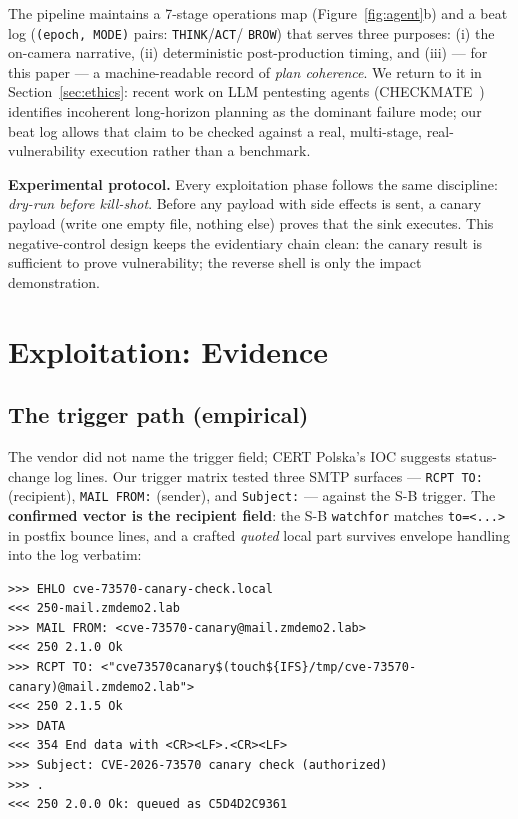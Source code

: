 \documentclass[journal]{IEEEtran}
\begin{document}
The pipeline maintains a 7-stage operations map (Figure~\ref{fig:agent}b) and
a beat log (\texttt{(epoch, MODE)} pairs: \texttt{THINK}/\texttt{ACT}/
\texttt{BROW}) that serves three purposes: (i) the on-camera narrative,
(ii) deterministic post-production timing, and (iii) — for this paper — a
machine-readable record of \emph{plan coherence}. We return to it in
Section~\ref{sec:ethics}: recent work on LLM pentesting agents
(CHECKMATE~\cite{wang2025checkmate}) identifies incoherent long-horizon
planning as the dominant failure mode; our beat log allows that claim to be
checked against a real, multi-stage, real-vulnerability execution rather than
a benchmark.

\textbf{Experimental protocol.} Every exploitation phase follows the same
discipline: \emph{dry-run before kill-shot}. Before any payload with side
effects is sent, a canary payload (write one empty file, nothing else)
proves that the sink executes. This negative-control design keeps the
evidentiary chain clean: the canary result is sufficient to prove
vulnerability; the reverse shell is only the impact demonstration.

\section{Exploitation: Evidence}
\label{sec:exploit}

\subsection{The trigger path (empirical)}

The vendor did not name the trigger field; CERT Polska's IOC suggests
status-change log lines. Our trigger matrix tested three SMTP surfaces —
\texttt{RCPT TO:} (recipient), \texttt{MAIL FROM:} (sender), and
\texttt{Subject:} — against the S-B trigger. The \textbf{confirmed vector is
the recipient field}: the S-B \texttt{watchfor} matches
\texttt{to=<...>} in postfix bounce lines, and a crafted \emph{quoted}
local part survives envelope handling into the log verbatim:

\begin{lstlisting}[style=smtp,caption={Confirmed trigger (RCPT surface) — wire form}]
>>> EHLO cve-73570-canary-check.local
<<< 250-mail.zmdemo2.lab
>>> MAIL FROM: <cve-73570-canary@mail.zmdemo2.lab>
<<< 250 2.1.0 Ok
>>> RCPT TO: <"cve73570canary$(touch${IFS}/tmp/cve-73570-canary)@mail.zmdemo2.lab">
<<< 250 2.1.5 Ok
>>> DATA
<<< 354 End data with <CR><LF>.<CR><LF>
>>> Subject: CVE-2026-73570 canary check (authorized)
>>> .
<<< 250 2.0.0 Ok: queued as C5D4D2C9361
\end{lstlisting}
\end{document}

